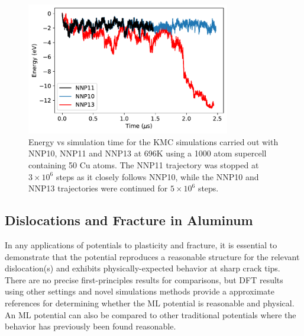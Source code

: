 \documentclass{article}
\begin{document}
\begin{figure}[H]
	\centering
	\includegraphics[width=3.5in]{kmcFigures/energy696.pdf}
	\caption{Energy vs simulation time for the KMC simulations carried out with NNP10, NNP11 and NNP13 at 696K using a 1000 atom supercell containing 50 Cu atoms. The NNP11 trajectory was stopped at $3\times10^6$ steps as it closely follows NNP10, while the NNP10 and NNP13 trajectories were continued for $5\times10^6$ steps.
	}
	\label{fig:ene696}
\end{figure}
%

\subsection{Dislocations and Fracture in Aluminum} \label{sct:fracture_dislocation}

In any applications of potentials to plasticity and fracture, it is essential to demonstrate that the potential reproduces a reasonable structure for the relevant dislocation(s) and exhibits physically-expected behavior at sharp crack tips.  There are no precise first-principles results for comparisons, but DFT results using other settings and novel simulations methods provide a approximate references for determining whether the ML potential is reasonable and physical.  An ML potential can also be compared to other traditional potentials where the behavior has previously been found reasonable.
\end{document}
